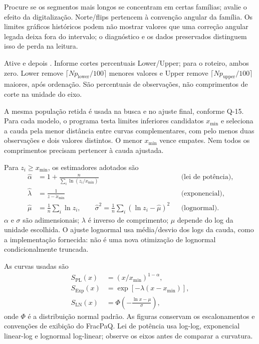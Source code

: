 Procure se os segmentos mais longos se concentram em certas famílias; avalie o efeito da digitalização. Norte/flips pertencem à convenção angular da família. Os limites gráficos históricos podem não mostrar valores que uma correção angular legada deixa fora do intervalo; o diagnóstico e os dados preservados distinguem isso de perda na leitura.

\label{sec:mle}
Ative  e depois . Informe cortes percentuais Lower/Upper; para o roteiro, ambos zero. Lower remove \(\lceil Np_{\mathrm{lower}}/100\rceil\) menores valores e Upper remove \(\lceil Np_{\mathrm{upper}}/100\rceil\) maiores, após ordenação. São percentuais de observações, não comprimentos de corte na unidade do eixo.

A mesma população retida é usada na busca e no ajuste final, conforme Q-15. Para cada modelo, o programa testa limites inferiores candidatos \(x_{\min}\) e seleciona a cauda pela menor distância entre curvas complementares, com pelo menos duas observações e dois valores distintos. O menor \(x_{\min}\) vence empates. Nem todos os comprimentos precisam pertencer à cauda ajustada.

Para \(z_i\geq x_{\min}\), os estimadores adotados são
\begin{align}
\widehat\alpha&=1+\frac{n}{\sum_i\ln(z_i/x_{\min})}
&&\text{(lei de potência)},\\
\widehat\lambda&=\frac{1}{\overline{z-x_{\min}}}
&&\text{(exponencial)},\\
\widehat\mu&=\frac1n\sum_i\ln z_i,\qquad
\widehat\sigma^2=\frac1n\sum_i(\ln z_i-\widehat\mu)^2
&&\text{(lognormal)}.
\end{align}
\(\alpha\) e \(\sigma\) são adimensionais; \(\lambda\) é inverso de comprimento; \(\mu\) depende do log da unidade escolhida. O ajuste lognormal usa média/desvio dos logs da cauda, como a implementação fornecida: não é uma nova otimização de lognormal condicionalmente truncada.

As curvas usadas são
\begin{align}
S_{\mathrm{PL}}(x)&=(x/x_{\min})^{1-\alpha},\\
S_{\mathrm{Exp}}(x)&=\exp[-\lambda(x-x_{\min})],\\
S_{\mathrm{LN}}(x)&=\Phi\!\left(-\frac{\ln x-\mu}{\sigma}\right),
\end{align}
onde \(\Phi\) é a distribuição normal padrão. As figuras conservam os escalonamentos e convenções de exibição do FracPaQ. Lei de potência usa log-log, exponencial linear-log e lognormal log-linear; observe os eixos antes de comparar a curvatura.

